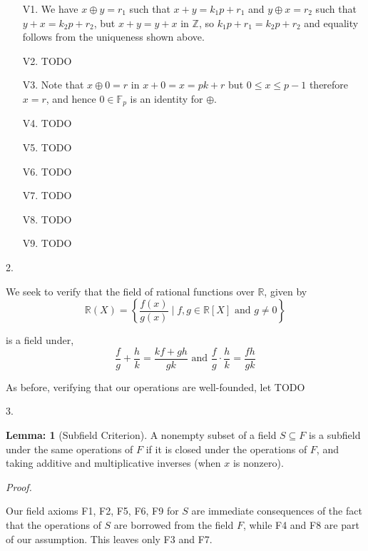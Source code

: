 \documentclass[letterpaper,11pt]{article}
\theoremstyle{definition}
\newtheorem*{lemma}{Lemma:}
\begin{document}
\begin{itemize}[noitemsep]
	\item [V1.] We have $x \oplus y = r_1$ such that $x + y = k_1p + r_1$ and $y \oplus x = r_2$ such that $y + x = k_2p + r_2$, but $x + y = y + x$ in $\mathbb{Z}$, so $k_1p + r_1 = k_2p + r_2$ and equality follows from the uniqueness shown above.
	\item [V2.] TODO
	\item [V3.] Note that $x \oplus 0 = r$ in $x + 0 = x = pk + r$ but $0 \leq x \leq p - 1$ therefore $x = r$, and hence $0 \in \mathbb{F}_p$ is an identity for $\oplus$. 
	\item [V4.] TODO
	\item [V5.] TODO
	\item [V6.] TODO
	\item [V7.] TODO
	\item [V8.] TODO
	\item [V9.] TODO
\end{itemize}

\hrulefill

\pagebreak
\begin{flushleft}
	2.
\end{flushleft}

We seek to verify that the field of rational functions over $\mathbb{R}$, given by $$\mathbb{R}(X) = \left\{ \frac{f(x)}{g(x)} \mid f, g \in \mathbb{R}[X] \text{ and } g\neq 0 \right\}$$

is a field under, $$\frac{f}{g} + \frac{h}{k} = \frac{kf+gh}{gk} \text{ and } \frac{f}{g} \cdot \frac{h}{k} = \frac{fh}{gk}$$

As before, verifying that our operations are well-founded, let TODO


\hrulefill

\pagebreak
\begin{flushleft}
	3.
\end{flushleft}

\begin{lemma}[Subfield Criterion]
	A nonempty subset of a field $S \subseteq F$ is a subfield under the same operations of $F$ if it is closed under the operations of $F$, and taking additive and multiplicative inverses (when $x$ is nonzero).
\end{lemma}

\textit{Proof.}

Our field axioms F1, F2, F5, F6, F9 for $S$ are immediate consequences of the fact that the operations of $S$ are borrowed from the field $F$, while F4 and F8 are part of our assumption. This leaves only F3 and F7. 
\end{document}
